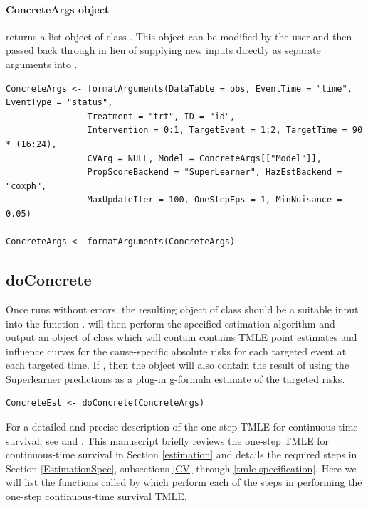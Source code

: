 \documentclass{report}
\newcommand{\1}{\ensuremath{\mathbf{1}}}
\begin{document}
\paragraph{ConcreteArgs object}
\label{concreteargs}
 returns a list object of class . This object can be modified by the user and then passed back through  in lieu of supplying new inputs directly as separate arguments into . 

\begin{lstlisting}
ConcreteArgs <- formatArguments(DataTable = obs, EventTime = "time", EventType = "status", 
				Treatment = "trt", ID = "id", 
				Intervention = 0:1, TargetEvent = 1:2, TargetTime = 90 * (16:24), 
				CVArg = NULL, Model = ConcreteArgs[["Model"]], 
				PropScoreBackend = "SuperLearner", HazEstBackend = "coxph", 
				MaxUpdateIter = 100, OneStepEps = 1, MinNuisance = 0.05)

ConcreteArgs <- formatArguments(ConcreteArgs)
\end{lstlisting}

\subsection{doConcrete}
\label{doConcrete}
Once  runs without errors, the resulting object of class  should be a suitable input into the function .  will then perform the specified estimation algorithm and output an object of class  which will contain contains TMLE point estimates and influence curves for the cause-specific absolute risks for each targeted event at each targeted time. If , then the  object will also contain the result of using the Superlearner predictions as a plug-in g-formula estimate of the targeted risks.

\begin{lstlisting}
ConcreteEst <- doConcrete(ConcreteArgs)
\end{lstlisting}

For a detailed and precise description of the one-step TMLE for continuous-time survival, see \cite{rytgaard_one-step_2021} and \cite{rytgaard_continuous-time_2021}. This manuscript briefly reviews the one-step TMLE for continuous-time survival in Section \ref{estimation} and details the required steps in Section \ref{EstimationSpec}, subsections \ref{CV} through \ref{tmle-specification}. Here we will list the functions called by  which perform each of the steps in performing the one-step continuous-time survival TMLE.
\end{document}
